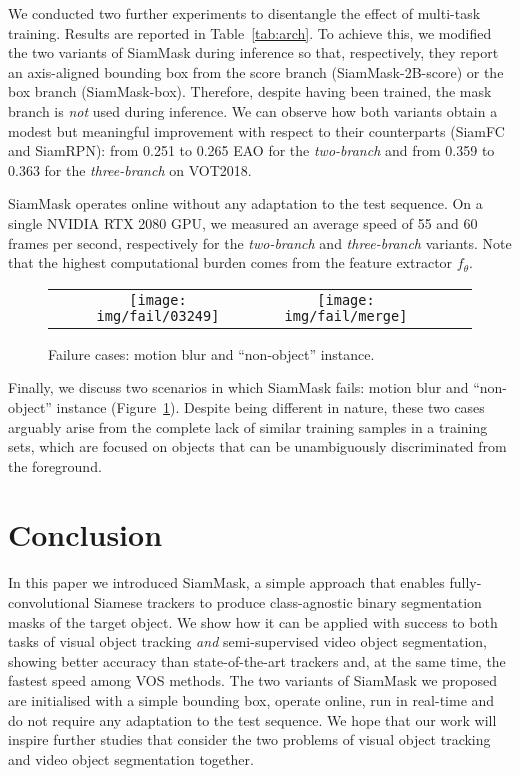 \documentclass[10pt,twocolumn,letterpaper]{article}
\newcommand{\mypar}[1]{\smallskip\noindent {\bf #1}\enskip}
\begin{document}
\mypar{Multi-task training.}
We conducted two further experiments to disentangle the effect of multi-task training.
Results are reported in Table~\ref{tab:arch}.
To achieve this, we modified the two variants of SiamMask during inference so that, respectively, they report an axis-aligned bounding box from the score branch (SiamMask-2B-score) or the box branch (SiamMask-box).
Therefore, despite having been trained, the mask branch is \emph{not} used during inference.
We can observe how both variants obtain a modest but meaningful improvement with respect to their counterparts (SiamFC and SiamRPN): from 0.251 to 0.265 EAO for the \emph{two-branch} and from 0.359 to 0.363 for the \emph{three-branch} on VOT2018.

\mypar{Timing.} 
SiamMask operates online without any adaptation to the test sequence.
On a single NVIDIA RTX 2080 GPU, we measured an average speed of 55 and 60 frames per second, respectively for the \emph{two-branch} and \emph{three-branch} variants.
Note that the highest computational burden comes from the feature extractor $f_{\theta}$.

\begin{figure}[t]
\centering
\setlength{\tabcolsep}{0.25ex}

\begin{tabular}
{c cccc}
& \texttt{[image: img/fail/03249]}
& \texttt{[image: img/fail/merge]}
\\


\end{tabular}
 \caption{Failure cases: motion blur and ``non-object'' instance.}
\label{fig:fail}
\vspace{-0.2cm}
\end{figure}

\mypar{Failure cases.}
Finally, we discuss two scenarios in which SiamMask fails: motion blur and ``non-object'' instance (Figure~\ref{fig:fail}).
Despite being different in nature, these two cases arguably arise from the complete lack of similar training samples in a training sets, which are focused on objects that can be unambiguously discriminated from the foreground.
 
\section{Conclusion}
\label{sec:conclusion}
In this paper we introduced SiamMask, a simple approach that enables fully-convolutional Siamese trackers to produce class-agnostic binary segmentation masks of the target object.
We show how it can be applied with success to both tasks of visual object tracking \emph{and} semi-supervised video object segmentation, showing better accuracy than state-of-the-art trackers and, at the same time, the fastest speed among VOS methods.
The two variants of SiamMask we proposed are initialised with a simple bounding box, operate online, run in real-time and do not require any adaptation to the test sequence.
We hope that our work will inspire further studies that consider the two problems of visual object tracking and video object segmentation together.
\end{document}
